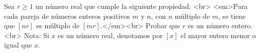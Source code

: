 Sea $r \geq 1$ un número real que cumple la siguiente propiedad: <br>
<em>Para cada pareja de números enteros positivos $m$ y $n$, con $n$ múltiplo de $m$, se tiene que $[nr]$ es múltiplo de $[mr]$.</em><br>
Probar que $r$ es un número entero.<br>
Nota: Si $x$ es un número real, denotamos por $[x]$ el mayor entero menor o igual que $x$.
